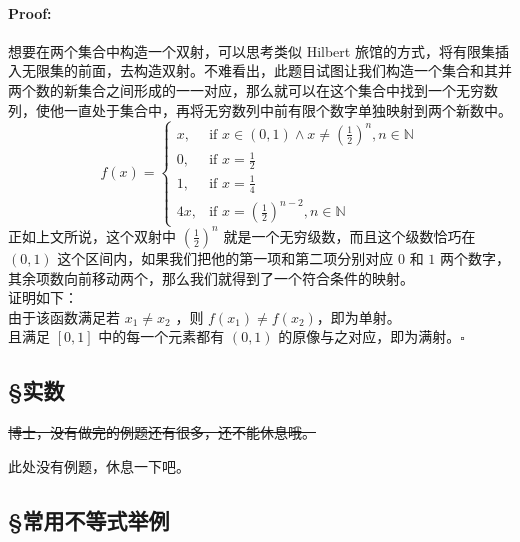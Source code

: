 \documentclass{article}
\begin{document}
\paragraph{Proof:}
想要在两个集合中构造一个双射，可以思考类似 Hilbert 旅馆的方式，将有限集插入无限集的前面，去构造双射。不难看出，此题目试图让我们构造一个集合和其并两个数的新集合之间形成的一一对应，那么就可以在这个集合中找到一个无穷数列，使他一直处于集合中，再将无穷数列中前有限个数字单独映射到两个新数中。\\
\[
f(x) =
\begin{cases}
    x,  & \text{if } x \in (0, 1) \land x \neq (\frac{1}{2})^n, n \in \mathbb{N} \\
    0,  & \text{if } x = \frac{1}{2} \\
    1,  & \text{if } x = \frac{1}{4} \\
    4x, & \text{if } x = (\frac{1}{2})^{n - 2}, n \in \mathbb{N}
\end{cases}
\]
正如上文所说，这个双射中 $(\frac{1}{2})^n$ 就是一个无穷级数，而且这个级数恰巧在 $(0, 1)$ 这个区间内，如果我们把他的第一项和第二项分别对应 $0$ 和 $1$ 两个数字，其余项数向前移动两个，那么我们就得到了一个符合条件的映射。\\
证明如下：\\
由于该函数满足若 $x_1 \neq x_2$ ，则 $f(x_1) \neq f(x_2)$，即为单射。\\
且满足 $[0, 1]$ 中的每一个元素都有 $(0, 1)$ 的原像与之对应，即为满射。$\square$ \\
\subsection{\S 实数}

\sout{博士，没有做完的例题还有很多，还不能休息哦。}

此处没有例题，休息一下吧。
\subsection{\S 常用不等式举例}
\end{document}
